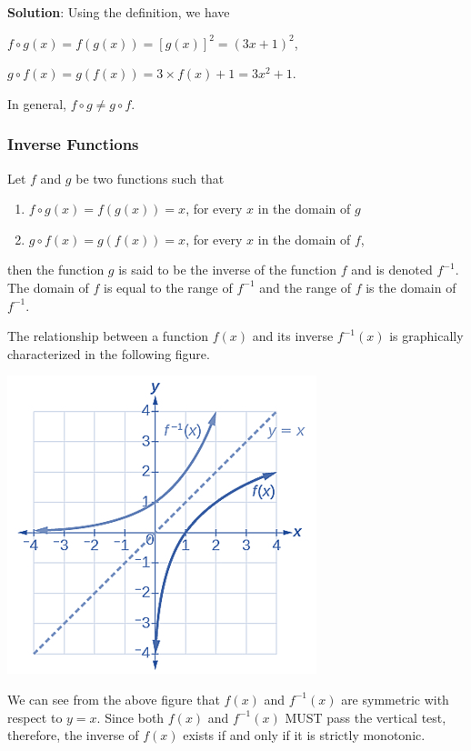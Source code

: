 \documentclass[
]{book}
\begin{document}
\textbf{Solution}: Using the definition, we have

\(f\circ g (x) = f(g(x)) = [g(x)]^2= (3x + 1)^2\),

\(g\circ f (x) = g(f(x)) = 3\times f(x) + 1 = 3x^2 + 1\).

In general, \(f\circ g \ne g \circ f\).

\hypertarget{inverse-functions}{%
\subsubsection{Inverse Functions}\label{inverse-functions}}

Let \(f\) and \(g\) be two functions such that

\begin{enumerate}
\def\labelenumi{\arabic{enumi}.}
\item
  \(f\circ g(x) = f(g(x)) = x\), for every \(x\) in the domain of \(g\)
\item
  \(g\circ f(x) = g(f(x)) = x\), for every \(x\) in the domain of \(f\),
\end{enumerate}

then the function \(g\) is said to be the inverse of the function \(f\) and is denoted \(f^{-1}\). The domain of \(f\) is equal to the range of \(f^{-1}\) and the range of \(f\) is the domain of \(f^{-1}\).

The relationship between a function \(f(x)\) and its inverse \(f^{-1}(x)\) is graphically characterized in the following figure.

\begin{center}\includegraphics[width=0.45\linewidth]{img01/w01note10-InverseFun} \end{center}

We can see from the above figure that \(f(x)\) and \(f^{-1}(x)\) are symmetric with respect to \(y = x\). Since both \(f(x)\) and \(f^{-1}(x)\) MUST pass the vertical test, therefore, the inverse of \(f(x)\) exists if and only if it is strictly monotonic.
\end{document}
